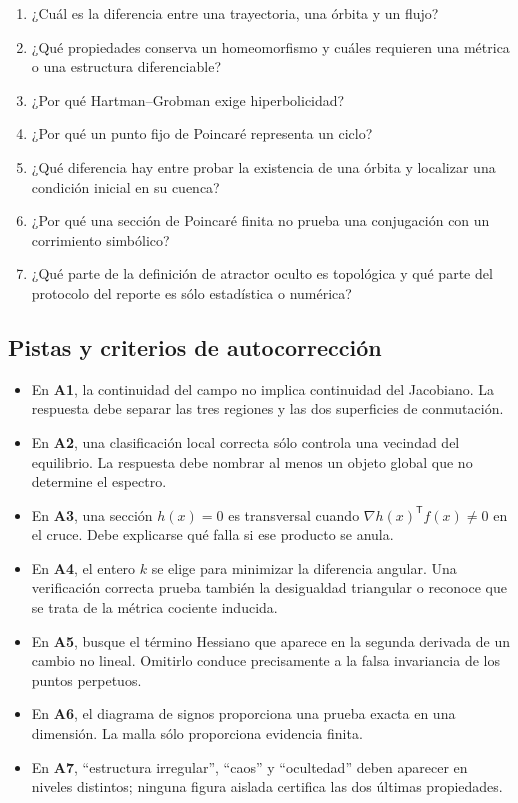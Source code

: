 \begin{enumerate}
 \item ¿Cuál es la diferencia entre una trayectoria, una órbita y un flujo?
 \item ¿Qué propiedades conserva un homeomorfismo y cuáles requieren una
 métrica o una estructura diferenciable?
 \item ¿Por qué Hartman--Grobman exige hiperbolicidad?
 \item ¿Por qué un punto fijo de Poincaré representa un ciclo?
 \item ¿Qué diferencia hay entre probar la existencia de una órbita y
 localizar una condición inicial en su cuenca?
 \item ¿Por qué una sección de Poincaré finita no prueba una conjugación
 con un corrimiento simbólico?
 \item ¿Qué parte de la definición de atractor oculto es topológica y qué
 parte del protocolo del reporte es sólo estadística o numérica?
\end{enumerate}

\subsection{Pistas y criterios de autocorrección}

\begin{itemize}
 \item En \textbf{A1}, la continuidad del campo no implica continuidad del
 Jacobiano. La respuesta debe separar las tres regiones y las dos superficies
 de conmutación.
 \item En \textbf{A2}, una clasificación local correcta sólo controla una
 vecindad del equilibrio. La respuesta debe nombrar al menos un objeto global
 que no determine el espectro.
 \item En \textbf{A3}, una sección $h(x)=0$ es transversal cuando
 $\nabla h(x)^{\mathsf T}f(x)\neq0$ en el cruce. Debe explicarse qué falla si
 ese producto se anula.
 \item En \textbf{A4}, el entero $k$ se elige para minimizar la diferencia
 angular. Una verificación correcta prueba también la desigualdad triangular
 o reconoce que se trata de la métrica cociente inducida.
 \item En \textbf{A5}, busque el término Hessiano que aparece en la segunda
 derivada de un cambio no lineal. Omitirlo conduce precisamente a la falsa
 invariancia de los puntos perpetuos.
 \item En \textbf{A6}, el diagrama de signos proporciona una prueba exacta en
 una dimensión. La malla sólo proporciona evidencia finita.
 \item En \textbf{A7}, ``estructura irregular'', ``caos'' y ``ocultedad'' deben
 aparecer en niveles distintos; ninguna figura aislada certifica las dos
 últimas propiedades.
\end{itemize}
